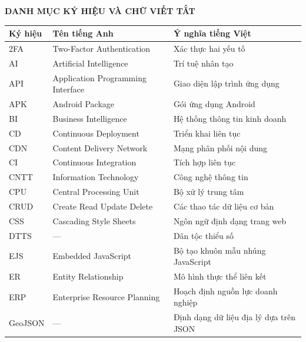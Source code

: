 \documentclass[../DoAn.tex]{subfiles}
\begin{document}
\begin{center}
    {\bfseries\fontsize{18pt}{22pt}\selectfont
        DANH MỤC KÝ HIỆU VÀ CHỮ VIẾT TẮT}
\end{center}
\vspace{1cm}

\begin{longtable}{p{3cm} p{5cm} p{6cm}}
    \toprule
    \textbf{Ký hiệu} & \textbf{Tên tiếng Anh} & \textbf{Ý nghĩa tiếng Việt} \\
    \midrule
    \endhead
    2FA     & Two-Factor Authentication          & Xác thực hai yếu tố \\[3pt]
    AI      & Artificial Intelligence            & Trí tuệ nhân tạo \\[3pt]
    API     & Application Programming Interface   & Giao diện lập trình ứng dụng \\[3pt]
    APK     & Android Package                    & Gói ứng dụng Android \\[3pt]
    BI      & Business Intelligence              & Hệ thống thông tin kinh doanh \\[3pt]
    CD      & Continuous Deployment              & Triển khai liên tục \\[3pt]
    CDN     & Content Delivery Network           & Mạng phân phối nội dung \\[3pt]
    CI      & Continuous Integration             & Tích hợp liên tục \\[3pt]
    CNTT    & Information Technology             & Công nghệ thông tin \\[3pt]
    CPU     & Central Processing Unit            & Bộ xử lý trung tâm \\[3pt]
    CRUD    & Create Read Update Delete          & Các thao tác dữ liệu cơ bản \\[3pt]
    CSS     & Cascading Style Sheets             & Ngôn ngữ định dạng trang web \\[3pt]
    DTTS    & ---                                & Dân tộc thiểu số \\[3pt]
    EJS     & Embedded JavaScript                & Bộ tạo khuôn mẫu nhúng JavaScript \\[3pt]
    ER      & Entity Relationship                & Mô hình thực thể liên kết \\[3pt]
    ERP     & Enterprise Resource Planning       & Hoạch định nguồn lực doanh nghiệp \\[3pt]
    GeoJSON & ---                                & Định dạng dữ liệu địa lý dựa trên JSON \\[3pt]

\end{longtable}
\end{document}
